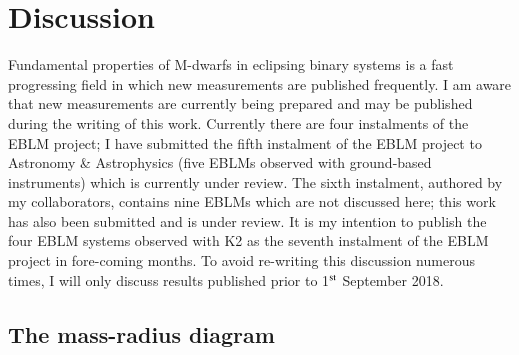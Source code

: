 \chapter{Discussion}\label{chapter:discussion}

Fundamental properties of M-dwarfs in eclipsing binary systems is a fast progressing field in which new measurements are published frequently. I am aware that new measurements are currently being prepared and may be published during the writing of this work. Currently there are four instalments of the EBLM project; I have submitted the fifth instalment of the EBLM project to Astronomy \& Astrophysics (five EBLMs observed with ground-based instruments) which is currently under review. The sixth instalment, authored by my collaborators, contains nine EBLMs which are not discussed here; this work has also been submitted and is under review. It is my intention to publish the four EBLM systems observed with K2 as the seventh instalment of the EBLM project in fore-coming months. 
 To avoid re-writing this discussion numerous times, I will only discuss results published prior to 1$^{\rm st}$ September 2018.  


%
%
\section{The mass-radius diagram}\label{discuss:mass-radius}

